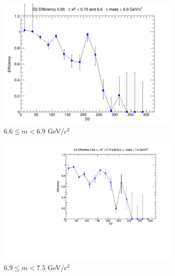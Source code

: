 \documentclass[11pt]{article}
\begin{document}
\begin{figure}[p]
\begin{subfigure}[b]{0.32\textwidth}
        \includegraphics[width=\textwidth]{./kTrackerEfficiencyPlots/D2_Efficiency_xF13_mass8.png}
        \caption{$6.6 \leq m < 6.9$ GeV/$c^2$}
    \end{subfigure}\vspace{0.5cm}
    \begin{subfigure}[b]{0.32\textwidth}
        \centering
        \includegraphics[width=\textwidth]{./kTrackerEfficiencyPlots/D2_Efficiency_xF13_mass9.pdf}
        \caption{$6.9 \leq m < 7.5$ GeV/$c^2$}
    \end{subfigure}\hfill
    \begin{subfigure}[b]{0.32\textwidth}
        \centering

\end{subfigure}
\end{figure}
\end{document}
